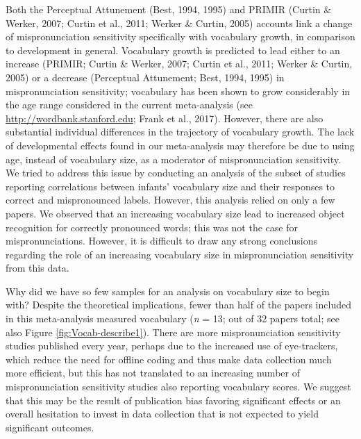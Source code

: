 \documentclass[man]{apa6}
\theoremstyle{definition}
\theoremstyle{definition}
\theoremstyle{definition}
\theoremstyle{remark}
\begin{document}
Both the Perceptual Attunement (Best, 1994, 1995) and PRIMIR (Curtin \&
Werker, 2007; Curtin et al., 2011; Werker \& Curtin, 2005) accounts link
a change of mispronunciation sensitivity specifically with vocabulary
growth, in comparison to development in general. Vocabulary growth is
predicted to lead either to an increase (PRIMIR; Curtin \& Werker, 2007;
Curtin et al., 2011; Werker \& Curtin, 2005) or a decrease (Perceptual
Attunement; Best, 1994, 1995) in mispronunciation sensitivity;
vocabulary has been shown to grow considerably in the age range
considered in the current meta-analysis (see
\url{http://wordbank.stanford.edu}; Frank et al., 2017). However, there
are also substantial individual differences in the trajectory of
vocabulary growth. The lack of developmental effects found in our
meta-analysis may therefore be due to using age, instead of vocabulary
size, as a moderator of mispronunciation sensitivity. We tried to
address this issue by conducting an analysis of the subset of studies
reporting correlations between infants' vocabulary size and their
responses to correct and mispronounced labels. However, this analysis
relied on only a few papers. We observed that an increasing vocabulary
size lead to increased object recognition for correctly pronounced
words; this was not the case for mispronunciations. However, it is
difficult to draw any strong conclusions regarding the role of an
increasing vocabulary size in mispronunciation sensitivity from this
data.

Why did we have so few samples for an analysis on vocabulary size to
begin with? Despite the theoretical implications, fewer than half of the
papers included in this meta-analysis measured vocabulary (\emph{n} =
13; out of 32 papers total; see also Figure \ref{fig:Vocab-describe1}).
There are more mispronunciation sensitivity studies published every
year, perhaps due to the increased use of eye-trackers, which reduce the
need for offline coding and thus make data collection much more
efficient, but this has not translated to an increasing number of
mispronunciation sensitivity studies also reporting vocabulary scores.
We suggest that this may be the result of publication bias favoring
significant effects or an overall hesitation to invest in data
collection that is not expected to yield significant outcomes.
\end{document}
